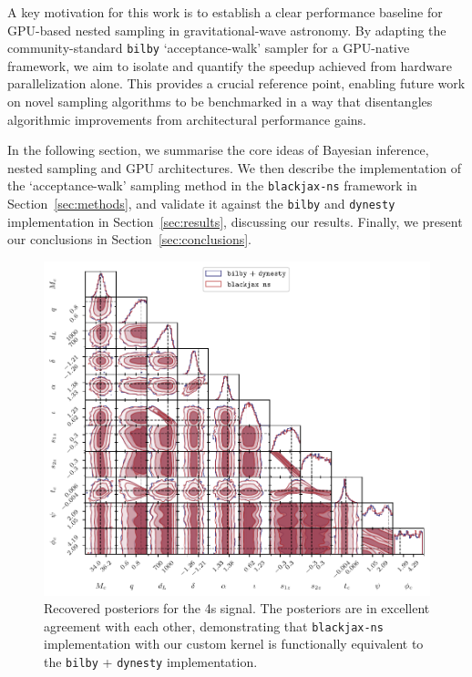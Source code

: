 \documentclass[fleqn,usenatbib]{mnras}
\begin{document}
A key motivation for this work is to establish a clear performance
baseline for GPU-based nested sampling in gravitational-wave astronomy.
By adapting the community-standard \texttt{bilby}
`acceptance-walk' sampler for a GPU-native framework, we aim to isolate
and quantify the speedup achieved from hardware parallelization alone.
This provides a crucial reference point, enabling future work on novel
sampling algorithms to be benchmarked in a way that disentangles
algorithmic improvements from architectural performance gains.

In the following section, we summarise the core ideas
of Bayesian inference, nested sampling and GPU architectures.
We then describe the implementation of the `acceptance-walk' sampling
method in the \texttt{blackjax-ns} framework in Section~\ref{sec:methods}, and validate it against
the \texttt{bilby} and \texttt{dynesty} implementation in Section~\ref{sec:results}, discussing
our results. Finally, we present our conclusions in Section~\ref{sec:conclusions}.

\begin{figure}
    \centering
    \includegraphics{figures/bilby_blackjax_comparison_4s.pdf}
    \caption{Recovered posteriors for the 4s signal. The posteriors are in excellent agreement with each other, demonstrating that
    \texttt{blackjax-ns} implementation with our custom kernel is functionally equivalent to the \texttt{bilby} + \texttt{dynesty} implementation.}
    \label{fig:4s_posteriors}
\end{figure}
\end{document}

